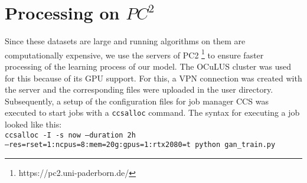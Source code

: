 \section{Processing on $PC^2$}
\label{sec:processing_on_pc2}


Since these datasets are large and running algorithms on them are computationally expensive, we use the servers of \ac{PC2} \footnote{https://pc2.uni-paderborn.de/} to ensure faster processing of the learning process of our model.
The OCuLUS cluster was used for this because of its GPU support.
For this, a VPN connection was created with the server and the corresponding files were uploaded in the user directory.
Subsequently, a setup of the configuration files for job manager CCS was executed to start jobs with a \texttt{ccsalloc} command.
The syntax for executing a job looked like this:
\\
\texttt{ccsalloc -I -s now --duration 2h }\\ \texttt{--res=rset=1:ncpus=8:mem=20g:gpus=1:rtx2080=t python gan\_train.py}
\\
